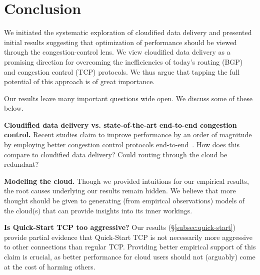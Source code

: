 \documentclass[10pt,sigconf]{acmart}
\newcommand{\T}[1]{\smallskip\noindent\textbf{#1}} %
\begin{document}
\section{Conclusion}
We initiated the systematic exploration of cloudified data delivery and presented initial results suggesting that optimization of performance should be viewed through the congestion-control lens.  We view cloudified data delivery as a promising direction for overcoming the inefficiencies of today's routing (BGP) and congestion control (TCP) protocols. We thus argue that tapping the full potential of this approach is of great importance. 

Our results leave many important questions wide open. We discuss some of these below.

\T{Cloudified data delivery vs. state-of-the-art end-to-end congestion control.} Recent studies claim to improve performance by an order of magnitude by employing better congestion control protocols end-to-end~\cite{PCC}. How does this compare to cloudified data delivery? Could routing through the cloud be redundant?

\T{Modeling the cloud.} Though we provided intuitions for our empirical results, the root causes underlying our results remain hidden. We believe that more thought should be given to generating (from empirical observations) models of the cloud(s) that can provide insights into its inner workings.

\T{Is Quick-Start TCP too aggressive?} Our results (\S\ref{subsec:quick-start}) provide partial evidence that Quick-Start TCP is not necessarily more aggressive to other connections than regular TCP. Providing better empirical support of this claim is crucial, as better performance for cloud users should not (arguably) come at the cost of harming others.
\end{document}
